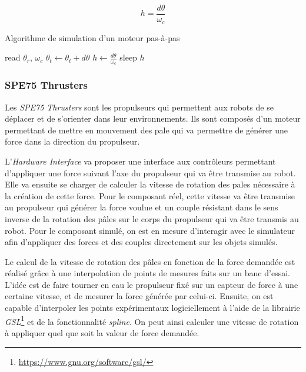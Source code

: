 				$$h = \frac{d\theta}{\omega_c}$$

				\begin{algorithm}[!htb]
					\caption{Algorithme de simulation d'un moteur pas-à-pas}
					\label{algo:stepper_motor}
					\begin{algorithmic}
							\STATE read $\theta_r$, $\omega_c$
								\STATE $\theta_t \leftarrow \theta_t + d\theta$
							\ENDIF
							\STATE $h \leftarrow \frac{d\theta}{\omega_c}$
							\STATE sleep $h$
						\ENDWHILE
					\end{algorithmic}
				\end{algorithm}

			\subsubsection{SPE75 Thrusters}
		
				Les \textit{SPE75 Thrusters} sont les propulseurs qui permettent aux robots de se déplacer et de s'orienter dans leur environnements. Ils sont composés d'un moteur permettant de mettre en mouvement des pale qui va permettre de générer une force dans la direction du propulseur.
				
				L'\textit{Hardware Interface} va proposer une interface aux contrôleurs permettant d'appliquer une force suivant l'axe du propulseur qui va être transmise au robot. Elle va ensuite se charger de calculer la vitesse de rotation des pales nécessaire à la création de cette force. Pour le composant réel, cette vitesse va être transmise au propulseur qui générer la force voulue et un couple résistant dans le sens inverse de la rotation des pâles sur le corps du propulseur qui va être transmis au robot. Pour le composant simulé, on est en mesure d'interagir avec le simulateur afin d'appliquer des forces et des couples directement sur les objets simulés. 
				
				Le calcul de la vitesse de rotation des pâles en fonction de la force demandée est réalisé grâce à une interpolation de points de mesures faits sur un banc d'essai. L'idée est de faire tourner en eau le propulseur fixé sur un capteur de force à une certaine vitesse, et de mesurer la force générée par celui-ci. Ensuite, on est capable d'interpoler les points expérimentaux logiciellement à l'aide de la librairie \textit{GSL}\footnote{\url{https://www.gnu.org/software/gsl/}} et de la fonctionnalité \textit{spline}. On peut ainsi calculer une vitesse de rotation à appliquer quel que soit la valeur de force demandée.
				
